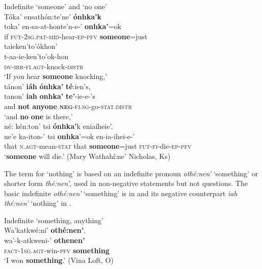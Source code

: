 \documentclass[output=paper,colorlinks,citecolor=brown]{langscibook}
\begin{document}
{\ea\label{ex:moh:70}Indefinite ‘someone’ and ‘no one’\\
    \glll Tóka’ ensathón:te’ne’ \textbf{ónhka’k} \\ 
           toka’ en-sa-at-honte’n-e-’ \textbf{onhka’}=ok  \\ 
          if \textsc{fut-2sg.pat-mid}-hear-\textsc{ep-pfv} \textbf{someone}=just \\
    \glt 
    {\qquad} \glll taieken’to’ókhon’ \\ 
           t-aa-ie-ken’to’ok-hon \\ 
           \textsc{dv-irr-fi.agt}-knock-\textsc{distr}\\
    \glt ‘If you hear \textbf{someone} knocking,’\\ \medskip 
    \glll tánon’ \textbf{iáh} \textbf{ónhka’} \textbf{té}:ien’s, \\ 
          tanon’ \textbf{iah} \textbf{onhka’} \textbf{te’}-ie-e-’s \\
          and \textbf{not} \textbf{anyone} \textbf{\textsc{neg}}\textsc{-fi.sg}-go-\textsc{stat.distr}\\
    \glt ‘and \textbf{no} \textbf{one} is there,’ \\ \medskip
    \glll né: kén:ton’ tsi \textbf{ónhka’}k eniaíheie’. \\ 
          ne’e ka-iton-’ tsi \textbf{onhka}’=ok en-ia-ihei-e-’ \\
          that \textsc{n.agt}-mean-\textsc{stat} that \textbf{someone}=just \textsc{fut-fi-}die-\textsc{ep-pfv}\\
    \glt   ‘\textbf{someone} will die.’ (Mary Wathahí:ne’ Nicholas, Ks)
\z} %

The term for ‘nothing’ is based on an indefinite pronoun \textit{othé:nen’} ‘something’ or shorter form \textit{thé:nen’}, used in non-negative statements but not questions. The basic indefinite \textit{othé:nen’} ‘something’ is in  and its negative counterpart \textit{iah thé:nen’} ‘nothing’ in .

\ea\label{ex:moh:71}Indefinite ‘something, anything’\\
    \glll Wa’katkwé:ni’ \textbf{othé:nen’}. \\
         wa’-k-atkweni-’ \textbf{othenen’}\\
         \textsc{fact-1sg.agt}-win-\textsc{pfv}    \textbf{something}\\
    \glt ‘I won \textbf{something}.’ (Vina Loft, O)
\z
\end{document}
